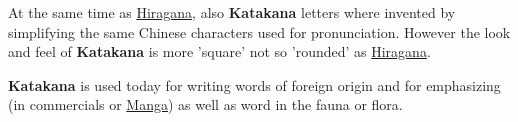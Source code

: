 At the same time as \hyperref[sec:Hiragana]{Hiragana}, also \textbf{Katakana}
letters where invented by simplifying the same Chinese characters used for
pronunciation.  However the look and feel of \textbf{Katakana} is more 'square'
not so 'rounded' as \hyperref[sec:Hiragana]{Hiragana}.

\textbf{Katakana} is used today for writing words of foreign origin and for
emphasizing (in commercials or \hyperref[sec:Manga]{Manga}) as well as word in
the fauna or flora.

